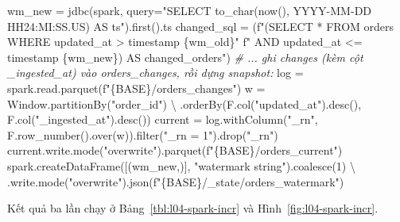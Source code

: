 \documentclass[
  12pt,
  a4paper,
]{report}
\newenvironment{Shaded}{}{}
\newcommand{\BuiltInTok}[1]{\textcolor[rgb]{0.00,0.50,0.00}{#1}}
\newcommand{\CommentTok}[1]{\textcolor[rgb]{0.38,0.63,0.69}{\textit{#1}}}
\newcommand{\DecValTok}[1]{\textcolor[rgb]{0.25,0.63,0.44}{#1}}
\newcommand{\NormalTok}[1]{#1}
\newcommand{\OperatorTok}[1]{\textcolor[rgb]{0.40,0.40,0.40}{#1}}
\newcommand{\SpecialCharTok}[1]{\textcolor[rgb]{0.25,0.44,0.63}{#1}}
\newcommand{\SpecialStringTok}[1]{\textcolor[rgb]{0.73,0.40,0.53}{#1}}
\newcommand{\StringTok}[1]{\textcolor[rgb]{0.25,0.44,0.63}{#1}}
\begin{document}
\begin{Shaded}
\begin{Highlighting}[]
\NormalTok{wm\_new }\OperatorTok{=}\NormalTok{ jdbc(spark, query}\OperatorTok{=}\StringTok{"SELECT to\_char(now(), \textquotesingle{}YYYY{-}MM{-}DD HH24:MI:SS.US\textquotesingle{}) AS ts"}\NormalTok{).first().ts}
\NormalTok{changed\_sql }\OperatorTok{=}\NormalTok{ (}\SpecialStringTok{f"(SELECT * FROM orders WHERE updated\_at \textgreater{} timestamp \textquotesingle{}}\SpecialCharTok{\{}\NormalTok{wm\_old}\SpecialCharTok{\}}\SpecialStringTok{\textquotesingle{}"}
               \SpecialStringTok{f" AND updated\_at \textless{}= timestamp \textquotesingle{}}\SpecialCharTok{\{}\NormalTok{wm\_new}\SpecialCharTok{\}}\SpecialStringTok{\textquotesingle{}) AS changed\_orders"}\NormalTok{)}
\CommentTok{\# ... ghi changes (kèm cột \_ingested\_at) vào orders\_changes, rồi dựng snapshot:}
\NormalTok{log }\OperatorTok{=}\NormalTok{ spark.read.parquet(}\SpecialStringTok{f"}\SpecialCharTok{\{}\NormalTok{BASE}\SpecialCharTok{\}}\SpecialStringTok{/orders\_changes"}\NormalTok{)}
\NormalTok{w }\OperatorTok{=}\NormalTok{ Window.partitionBy(}\StringTok{"order\_id"}\NormalTok{) }\OperatorTok{\textbackslash{}}
\NormalTok{    .orderBy(F.col(}\StringTok{"updated\_at"}\NormalTok{).desc(), F.col(}\StringTok{"\_ingested\_at"}\NormalTok{).desc())}
\NormalTok{current }\OperatorTok{=}\NormalTok{ log.withColumn(}\StringTok{"\_rn"}\NormalTok{, F.row\_number().over(w)).}\BuiltInTok{filter}\NormalTok{(}\StringTok{"\_rn = 1"}\NormalTok{).drop(}\StringTok{"\_rn"}\NormalTok{)}
\NormalTok{current.write.mode(}\StringTok{"overwrite"}\NormalTok{).parquet(}\SpecialStringTok{f"}\SpecialCharTok{\{}\NormalTok{BASE}\SpecialCharTok{\}}\SpecialStringTok{/orders\_current"}\NormalTok{)}
\NormalTok{spark.createDataFrame([(wm\_new,)], }\StringTok{"watermark string"}\NormalTok{).coalesce(}\DecValTok{1}\NormalTok{) }\OperatorTok{\textbackslash{}}
\NormalTok{    .write.mode(}\StringTok{"overwrite"}\NormalTok{).json(}\SpecialStringTok{f"}\SpecialCharTok{\{}\NormalTok{BASE}\SpecialCharTok{\}}\SpecialStringTok{/\_state/orders\_watermark"}\NormalTok{)}
\end{Highlighting}
\end{Shaded}

Kết quả ba lần chạy ở Bảng~\ref{tbl:l04-spark-incr} và
Hình~\ref{fig:l04-spark-incr}.
\end{document}
